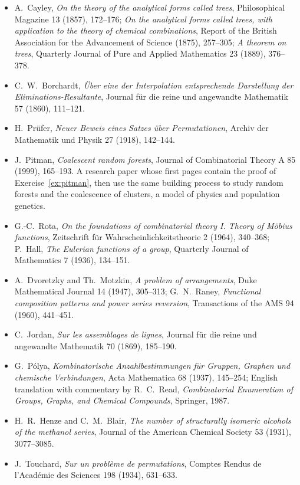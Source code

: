 \begin{itemize}
\item A.~Cayley, \emph{On the theory of the analytical forms called trees}, Philosophical Magazine 13 (1857), 172--176;
\emph{On the analytical forms called trees, with application to the theory of chemical combinations}, Report of the British
Association for the Advancement of Science (1875), 257--305; \emph{A theorem on trees}, Quarterly Journal of Pure and Applied
Mathematics 23 (1889), 376--378.
\item C.~W.~Borchardt, \emph{\"Uber eine der Interpolation entsprechende Darstellung der Eliminations-Resultante}, Journal f\"ur
die reine und angewandte Mathematik 57 (1860), 111--121.
\item H.~Pr\"ufer, \emph{Neuer Beweis eines Satzes \"uber Permutationen}, Archiv der Mathematik und Physik 27 (1918), 142--144.
\item J.~Pitman, \emph{Coalescent random forests}, Journal of Combinatorial Theory A 85 (1999), 165--193. A research paper
whose first pages contain the proof of Exercise~\ref{ex:pitman}, then use the same building process to study random forests
and the coalescence of clusters, a model of physics and population genetics.
\item G.-C.~Rota, \emph{On the foundations of combinatorial theory I. Theory of M\"obius functions}, Zeitschrift f\"ur
Wahrscheinlichkeitstheorie 2 (1964), 340--368; P.~Hall, \emph{The Eulerian functions of a group}, Quarterly Journal of
Mathematics 7 (1936), 134--151.
\item A.~Dvoretzky and Th.~Motzkin, \emph{A problem of arrangements}, Duke Mathematical Journal 14 (1947), 305--313;
G.~N.~Raney, \emph{Functional composition patterns and power series reversion}, Transactions of the AMS 94 (1960), 441--451.
\item C.~Jordan, \emph{Sur les assemblages de lignes}, Journal f\"ur die reine und angewandte Mathematik 70 (1869), 185--190.
\item G.~P\'olya, \emph{Kombinatorische Anzahlbestimmungen f\"ur Gruppen, Graphen und chemische Verbindungen}, Acta
Mathematica 68 (1937), 145--254; English translation with commentary by R.~C.~Read, \emph{Combinatorial Enumeration of Groups,
Graphs, and Chemical Compounds}, Springer, 1987.
\item H.~R.~Henze and C.~M.~Blair, \emph{The number of structurally isomeric alcohols of the methanol series}, Journal of the
American Chemical Society 53 (1931), 3077--3085.
\item J.~Touchard, \emph{Sur un probl\`eme de permutations}, Comptes Rendus de l'Acad\'emie des Sciences 198 (1934), 631--633.

\end{itemize}
